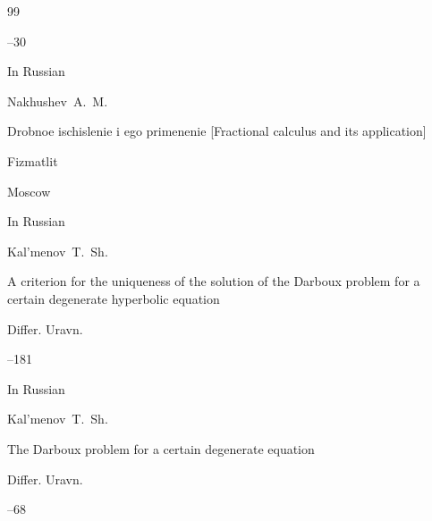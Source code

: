 \begin{thebibliography}{99}


--30








\lang In Russian

\by Nakhushev~A.~M.

\book Drobnoe ischislenie i ego primenenie \rm [Fractional calculus and its application]


\publ Fizmatlit

\publaddr Moscow













\lang In Russian

\by Kal'menov~T.~Sh.

\paper A criterion for the uniqueness of the solution of the Darboux problem for a certain degenerate hyperbolic equation

\jour Differ. Uravn.




--181










\lang In Russian

\by Kal'menov~T.~Sh.

\paper The Darboux problem for a certain degenerate equation

\jour Differ. Uravn.




--68






\end{thebibliography}
